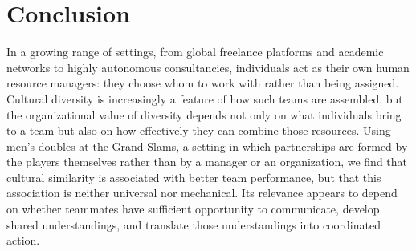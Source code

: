 \documentclass[10pt]{article}
\begin{document}

\section{Conclusion}
In a growing range of settings, from global freelance platforms and academic networks to highly autonomous consultancies, individuals act as their own human resource managers: they choose whom to work with rather than being assigned. Cultural diversity is increasingly a feature of how such teams are assembled, but the organizational value of diversity depends not only on what individuals bring to a team but also on how effectively they can combine those resources. Using men's doubles at the Grand Slams, a setting in which partnerships are formed by the players themselves rather than by a manager or an organization, we find that cultural similarity is associated with better team performance, but that this association is neither universal nor mechanical. Its relevance appears to depend on whether teammates have sufficient opportunity to communicate, develop shared understandings, and translate those understandings into coordinated action.
\end{document}
